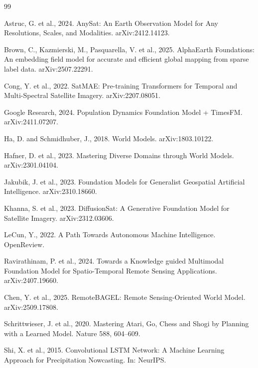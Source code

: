 \documentclass{article}
\begin{document}
\begin{thebibliography}{99}

Astruc, G. et al., 2024. AnySat: An Earth Observation Model for Any Resolutions, Scales, and Modalities. arXiv:2412.14123.

Brown, C., Kazmierski, M., Pasquarella, V. et al., 2025. AlphaEarth Foundations: An embedding field model for accurate and efficient global mapping from sparse label data. arXiv:2507.22291.

Cong, Y. et al., 2022. SatMAE: Pre-training Transformers for Temporal and Multi-Spectral Satellite Imagery. arXiv:2207.08051.

Google Research, 2024. Population Dynamics Foundation Model + TimesFM. arXiv:2411.07207.

Ha, D. and Schmidhuber, J., 2018. World Models. arXiv:1803.10122.

Hafner, D. et al., 2023. Mastering Diverse Domains through World Models. arXiv:2301.04104.

Jakubik, J. et al., 2023. Foundation Models for Generalist Geospatial Artificial Intelligence. arXiv:2310.18660.

Khanna, S. et al., 2023. DiffusionSat: A Generative Foundation Model for Satellite Imagery. arXiv:2312.03606.

LeCun, Y., 2022. A Path Towards Autonomous Machine Intelligence. OpenReview.

Ravirathinam, P. et al., 2024. Towards a Knowledge guided Multimodal Foundation Model for Spatio-Temporal Remote Sensing Applications. arXiv:2407.19660.

Chen, Y. et al., 2025. RemoteBAGEL: Remote Sensing-Oriented World Model. arXiv:2509.17808.

Schrittwieser, J. et al., 2020. Mastering Atari, Go, Chess and Shogi by Planning with a Learned Model. Nature 588, 604--609.

Shi, X. et al., 2015. Convolutional LSTM Network: A Machine Learning Approach for Precipitation Nowcasting. In: NeurIPS.


\end{thebibliography}
\end{document}
